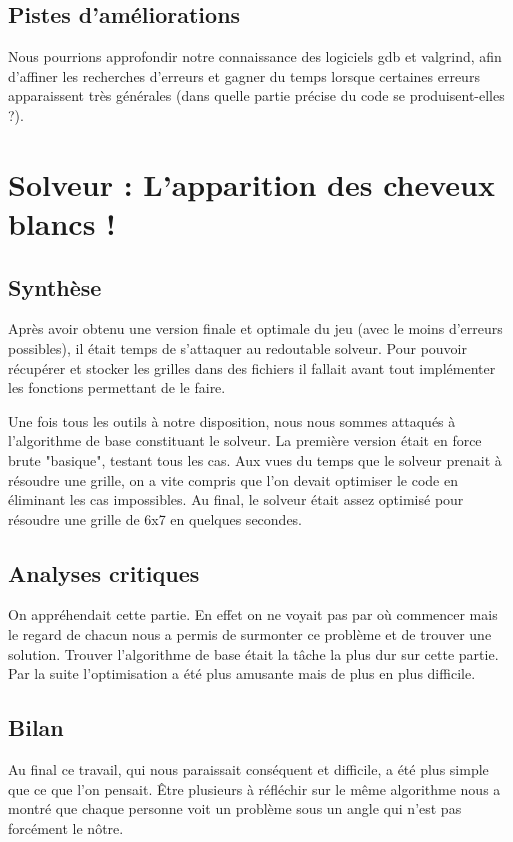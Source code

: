 \documentclass[12pt]{article}
\begin{document}
\subsection{Pistes d'améliorations}
Nous pourrions approfondir notre connaissance des logiciels gdb et valgrind, afin d'affiner les recherches d'erreurs et gagner du temps lorsque certaines erreurs apparaissent très générales (dans quelle partie précise du code se produisent-elles ?).

\section{Solveur : L'apparition des cheveux blancs !}
\subsection{Synthèse}
Après avoir obtenu une version finale et optimale du jeu (avec le moins d'erreurs possibles), il était temps de s'attaquer au redoutable solveur. Pour pouvoir récupérer et stocker les grilles dans des fichiers il fallait avant tout implémenter les fonctions permettant de le faire. 

Une fois tous les outils à notre disposition, nous nous sommes attaqués à l'algorithme de base constituant le solveur. La première version était en force brute "basique", testant tous les cas. Aux vues du temps que le solveur prenait à résoudre une grille, on a vite compris que l'on devait optimiser le code en éliminant les cas impossibles. Au final, le solveur était assez optimisé pour résoudre une grille de 6x7 en quelques secondes.

\subsection{Analyses critiques}
On appréhendait cette partie. En effet on ne voyait pas par où commencer mais le regard de chacun nous a permis de surmonter ce problème et de trouver une solution. Trouver l'algorithme de base était la tâche la plus dur sur cette partie. Par la suite l'optimisation a été plus amusante mais de plus en plus difficile.

\subsection{Bilan}
Au final ce travail, qui nous paraissait conséquent et difficile, a été plus simple que ce que l'on pensait. Être plusieurs à réfléchir sur le même algorithme nous a montré que chaque personne voit un problème sous un angle qui n'est pas forcément le nôtre.
\end{document}
